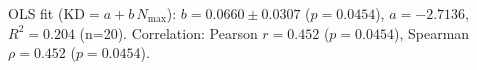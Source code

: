 OLS fit ($\mathrm{KD}=a+b\,N_{\max}$): $b=0.0660\pm 0.0307$ ($p=0.0454$), $a=-2.7136$, $R^2=0.204$ (n=20). Correlation: Pearson $r=0.452$ ($p=0.0454$), Spearman $\rho=0.452$ ($p=0.0454$).
